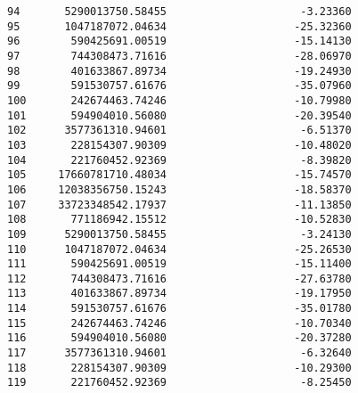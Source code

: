 \documentclass[11pt]{article}
\begin{document}
\begin{tcolorbox}[breakable, size=fbox, boxrule=.5pt, pad at break*=1mm, opacityfill=0]
\begin{Verbatim}[commandchars=\\\{\}]
94       5290013750.58455                     -3.23360
95       1047187072.04634                    -25.32360
96        590425691.00519                    -15.14130
97        744308473.71616                    -28.06970
98        401633867.89734                    -19.24930
99        591530757.61676                    -35.07960
100       242674463.74246                    -10.79980
101       594904010.56080                    -20.39540
102      3577361310.94601                     -6.51370
103       228154307.90309                    -10.48020
104       221760452.92369                     -8.39820
105     17660781710.48034                    -15.74570
106     12038356750.15243                    -18.58370
107     33723348542.17937                    -11.13850
108       771186942.15512                    -10.52830
109      5290013750.58455                     -3.24130
110      1047187072.04634                    -25.26530
111       590425691.00519                    -15.11400
112       744308473.71616                    -27.63780
113       401633867.89734                    -19.17950
114       591530757.61676                    -35.01780
115       242674463.74246                    -10.70340
116       594904010.56080                    -20.37280
117      3577361310.94601                     -6.32640
118       228154307.90309                    -10.29300
119       221760452.92369                     -8.25450


\end{Verbatim}
\end{tcolorbox}
\end{document}
